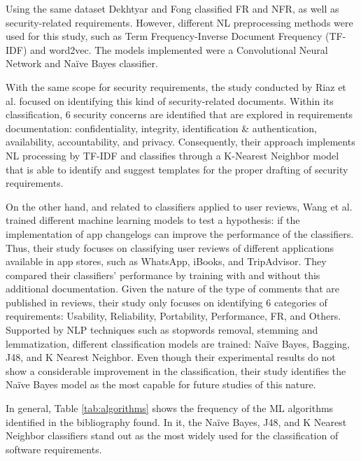 \documentclass[conference]{IEEEtran}
\begin{document}
Using the same dataset Dekhtyar and Fong \cite{8049170} classified FR and NFR, as well as security-related requirements. However, different NL preprocessing methods were used for this study, such as Term Frequency-Inverse Document Frequency (TF-IDF) and word2vec. The models implemented were a Convolutional Neural Network and Naïve Bayes classifier.

With the same scope for security requirements, the study conducted by Riaz et al. \cite{6912260} focused on identifying this kind of security-related documents. Within its classification, 6 security concerns are identified that are explored in requirements documentation: confidentiality, integrity, identification \& authentication, availability, accountability, and privacy. Consequently, their approach implements NL processing by TF-IDF and classifies through a K-Nearest Neighbor model that is able to identify and suggest templates for the proper drafting of security requirements.

On the other hand, and related to classifiers applied to user reviews, Wang et al. \cite{Wang:2018:ACI:3239235.3267428} trained different machine learning models to test a hypothesis: if the implementation of app changelogs can improve the performance of the classifiers. Thus, their study focuses on classifying user reviews of different applications available in app stores, such as WhatsApp, iBooks, and TripAdvisor. They compared their classifiers' performance by training with and without this additional documentation. Given the nature of the type of comments that are published in reviews, their study only focuses on identifying 6 categories of requirements: Usability, Reliability, Portability, Performance, FR, and Others. Supported by NLP techniques such as stopwords removal, stemming and lemmatization, different classification models are trained: Naïve Bayes, Bagging, J48, and K Nearest Neighbor. Even though their experimental results do not show a considerable improvement in the classification, their study identifies the Naïve Bayes model as the most capable for future studies of this nature.

In general, Table \ref{tab:algorithms} shows the frequency of the ML algorithms identified in the bibliography found. In it, the Naïve Bayes, J48, and K Nearest Neighbor classifiers stand out as the most widely used for the classification of software requirements.
\end{document}
